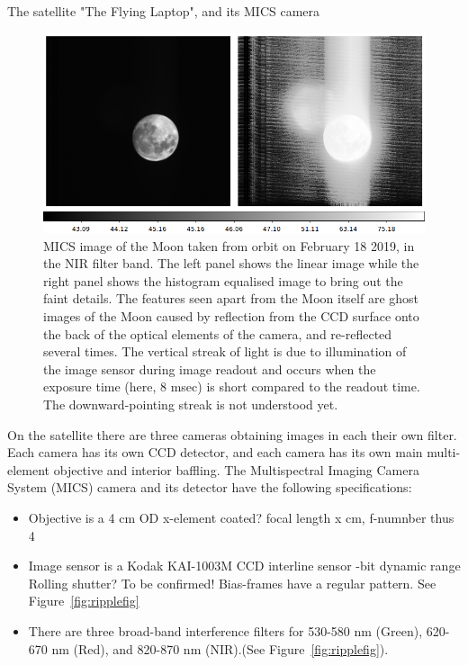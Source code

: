 \documentclass[final,hyperref={pdfpagelabels=false}]{beamer}
\begin{document}
\begin{frame}[t]
\begin{columns}[t]
\begin{column}{.23\textwidth}
\begin{block}{The satellite "The Flying Laptop", and its MICS camera}
\begin{figure}
    \centering
    \vspace{-1cm}
    \includegraphics[viewport=10 47 750 310,clip]{fig/Moon2panels.png}
    \caption{MICS image of the Moon taken from orbit on February 18 2019, in the NIR filter band. The left panel shows the linear image while the right panel shows the histogram equalised image to bring  out the faint details. The features seen apart from the Moon itself are ghost images of the Moon caused by reflection from the CCD surface onto the back of the optical elements of the camera, and re-reflected several times. The vertical streak of light is due to illumination of the image sensor during image readout and occurs when the exposure time (here, 8 msec) is short compared to the readout time. The downward-pointing streak is not understood yet.}
    \label{fig:my_label}
\end{figure}

On the satellite there are three cameras obtaining images in each their own filter. Each camera has its own CCD detector, and each camera has its own main multi-element objective and interior baffling.
The Multispectral Imaging Camera System (MICS) camera and its detector have the following specifications:
\begin{itemize}
    \item Objective is a 4 cm OD x-element
    \subitem coated?
    \subitem focal length x cm, f-numnber thus 4
    \item Image sensor is a Kodak KAI-1003M CCD interline sensor 
    -bit dynamic range
    \subitem Rolling shutter? To be confirmed!
    \subitem Bias-frames have a regular pattern. See Figure~\ref{fig:ripplefig}
    \item There are three broad-band interference filters for 530-580 nm (Green), 620-670 nm (Red), and 820-870 nm (NIR).(See Figure~\ref{fig:ripplefig}).
\end{itemize}


\end{block}
\end{column}
\end{columns}
\end{frame}
\end{document}
